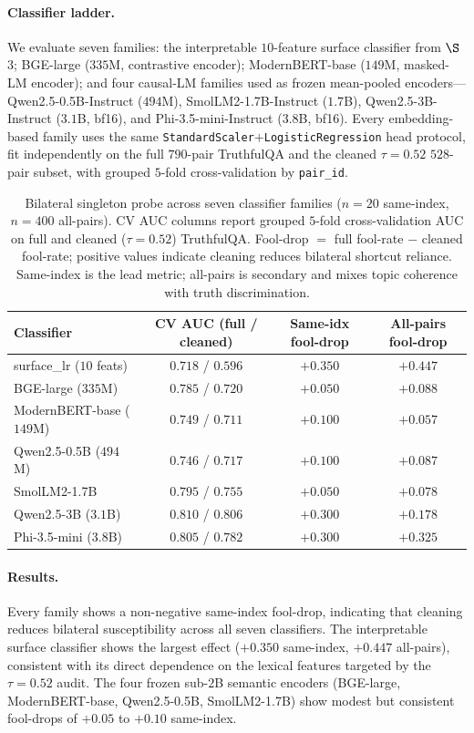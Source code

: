 \paragraph{Classifier ladder.} We evaluate seven families: the
interpretable $10$-feature surface classifier from $\S$3; BGE-large
($335$M, contrastive encoder); ModernBERT-base ($149$M, masked-LM
encoder); and four causal-LM families used as frozen mean-pooled
encoders---Qwen2.5-0.5B-Instruct ($494$M), SmolLM2-1.7B-Instruct
($1.7$B), Qwen2.5-3B-Instruct ($3.1$B, bf16), and Phi-3.5-mini-Instruct
($3.8$B, bf16). Every embedding-based family uses the same
\texttt{StandardScaler}${+}$\texttt{LogisticRegression} head protocol,
fit independently on the full $790$-pair TruthfulQA and the cleaned
$\tau=0.52$ $528$-pair subset, with grouped $5$-fold cross-validation
by \texttt{pair\_id}.

\begin{table}[H]
\centering
\small
\caption{Bilateral singleton probe across seven classifier families
($n=20$ same-index, $n=400$ all-pairs). CV AUC columns report
grouped $5$-fold cross-validation AUC on full and cleaned
($\tau=0.52$) TruthfulQA. Fool-drop $=$ full fool-rate $-$ cleaned
fool-rate; positive values indicate cleaning reduces bilateral
shortcut reliance. Same-index is the lead metric; all-pairs is
secondary and mixes topic coherence with truth discrimination.}
\label{tab:bilateral_probe}
\begin{tabular}{@{}lccc@{}}
\toprule
Classifier & CV AUC (full / cleaned) & Same-idx fool-drop & All-pairs fool-drop \\
\midrule
surface\_lr ($10$ feats)    & $0.718$ / $0.596$ & $+0.350$ & $+0.447$ \\
BGE-large ($335$M)          & $0.785$ / $0.720$ & $+0.050$ & $+0.088$ \\
ModernBERT-base ($149$M)    & $0.749$ / $0.711$ & $+0.100$ & $+0.057$ \\
Qwen2.5-0.5B ($494$M)       & $0.746$ / $0.717$ & $+0.100$ & $+0.087$ \\
SmolLM2-1.7B                & $0.795$ / $0.755$ & $+0.050$ & $+0.078$ \\
Qwen2.5-3B ($3.1$B)         & $0.810$ / $0.806$ & $+0.300$ & $+0.178$ \\
Phi-3.5-mini ($3.8$B)       & $0.805$ / $0.782$ & $+0.300$ & $+0.325$ \\
\bottomrule
\end{tabular}
\end{table}

\paragraph{Results.} Every family shows a non-negative same-index
fool-drop, indicating that cleaning reduces bilateral susceptibility
across all seven classifiers. The interpretable surface classifier
shows the largest effect ($+0.350$ same-index, $+0.447$ all-pairs),
consistent with its direct dependence on the lexical features
targeted by the $\tau=0.52$ audit. The four frozen sub-$2$B semantic
encoders (BGE-large, ModernBERT-base, Qwen2.5-0.5B, SmolLM2-1.7B)
show modest but consistent fool-drops of $+0.05$ to $+0.10$
same-index.

